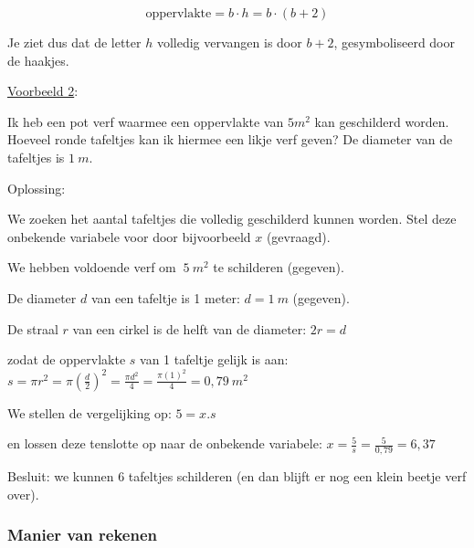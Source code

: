 \begin{equation*}
\mathrm{oppervlakte}=b\cdot h=b\cdot(b+2)
\end{equation*}

Je ziet dus dat de letter $h$ volledig vervangen is door $b+2$,
gesymboliseerd door de haakjes.

\medskip{}


\uline{Voorbeeld 2}:

Ik heb een pot verf waarmee een oppervlakte van $5m^2$
kan geschilderd worden. Hoeveel ronde tafeltjes kan ik hiermee een
likje verf geven? De diameter van de tafeltjes is $1~m$.

Oplossing: 

We zoeken het aantal tafeltjes die volledig geschilderd kunnen worden.
Stel deze onbekende variabele voor door bijvoorbeeld $x$ (gevraagd).

We hebben voldoende verf om $~5~m^2$
te schilderen (gegeven).

De diameter $d$ van een tafeltje is 1 meter: $d=1~m$ (gegeven).

De straal $r$ van een cirkel is de helft van de diameter: $2r=d$

zodat de oppervlakte $s$ van 1 tafeltje gelijk is aan: $s=\pi r^{2}=\pi\left(\frac{d}{2}\right)^{2}=\frac{\pi d^{2}}{4}=\frac{\pi(1)^{2}}{4}=0,79~m^2$

We stellen de vergelijking op: $5=x.s$ 

en lossen deze tenslotte op naar de onbekende variabele: $x=\frac{5}{s}=\frac{5}{0,79}=6,37$

Besluit: we kunnen 6 tafeltjes schilderen (en dan blijft er nog een
klein beetje verf over).


\subsubsection{Manier van rekenen}

